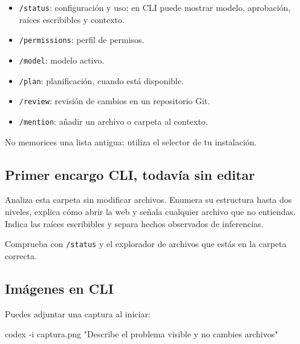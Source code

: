 \documentclass[10pt,a4paper,openany]{book}
\providecommand{\tightlist}{\setlength{\itemsep}{0.18em}\setlength{\parskip}{0pt}}
\newenvironment{Shaded}{}{}
\newcommand{\AttributeTok}[1]{\textcolor[rgb]{0.49,0.56,0.16}{#1}}
\newcommand{\ExtensionTok}[1]{#1}
\newcommand{\NormalTok}[1]{#1}
\newcommand{\StringTok}[1]{\textcolor[rgb]{0.25,0.44,0.63}{#1}}
\renewenvironment{Shaded}
  {\begin{tcolorbox}[
    enhanced,
    breakable,
    colback=CodeBg,
    colframe=Border,
    boxrule=0.5pt,
    arc=2mm,
    left=3mm,
    right=3mm,
    top=2.2mm,
    bottom=2.2mm,
    before skip=0.8em,
    after skip=0.9em
  ]}
  {\end{tcolorbox}}
\begin{document}
\begin{itemize}
\tightlist
\item
  \texttt{/status}: configuración y uso; en CLI puede mostrar modelo,
  aprobación, raíces escribibles y contexto.
\item
  \texttt{/permissions}: perfil de permisos.
\item
  \texttt{/model}: modelo activo.
\item
  \texttt{/plan}: planificación, cuando está disponible.
\item
  \texttt{/review}: revisión de cambios en un repositorio Git.
\item
  \texttt{/mention}: añadir un archivo o carpeta al contexto.
\end{itemize}

No memorices una lista antigua: utiliza el selector de tu instalación.

\subsection{Primer encargo CLI, todavía sin
editar}\label{primer-encargo-cli-todavuxeda-sin-editar}

\begin{Shaded}
\begin{Highlighting}[]
\NormalTok{Analiza esta carpeta sin modificar archivos. Enumera su estructura hasta dos}
\NormalTok{niveles, explica cómo abrir la web y señala cualquier archivo que no entiendas.}
\NormalTok{Indica las raíces escribibles y separa hechos observados de inferencias.}
\end{Highlighting}
\end{Shaded}

Comprueba con \texttt{/status} y el explorador de archivos que estás en
la carpeta correcta.

\subsection{Imágenes en CLI}\label{imuxe1genes-en-cli}

Puedes adjuntar una captura al iniciar:

\begin{Shaded}
\begin{Highlighting}[]
\ExtensionTok{codex} \AttributeTok{{-}i}\NormalTok{ captura.png }\StringTok{"Describe el problema visible y no cambies archivos"}
\end{Highlighting}
\end{Shaded}
\end{document}
